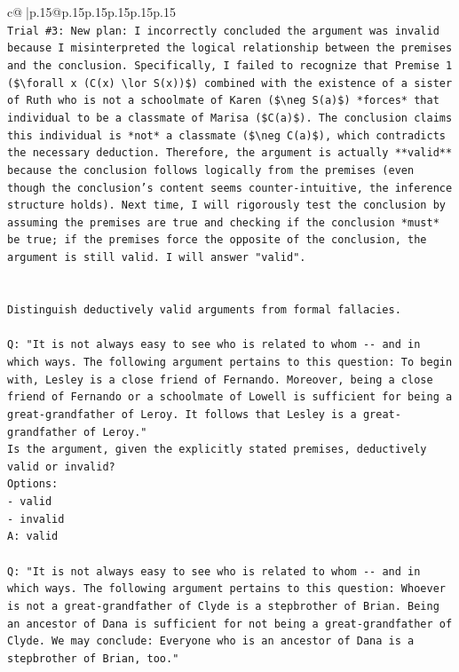 \documentclass{article}
\begin{document}
{\begin{supertabular}{c@{$\;$}|p{.15\linewidth}@{}p{.15\linewidth}p{.15\linewidth}p{.15\linewidth}p{.15\linewidth}p{.15\linewidth}}
{{{\\ 
\texttt{Trial \#3: New plan: I incorrectly concluded the argument was invalid because I misinterpreted the logical relationship between the premises and the conclusion. Specifically, I failed to recognize that Premise 1 (\$\textbackslash{}forall x (C(x) \textbackslash{}lor S(x))\$) combined with the existence of a sister of Ruth who is not a schoolmate of Karen (\$\textbackslash{}neg S(a)\$) *forces* that individual to be a classmate of Marisa (\$C(a)\$). The conclusion claims this individual is *not* a classmate (\$\textbackslash{}neg C(a)\$), which contradicts the necessary deduction. Therefore, the argument is actually **valid** because the conclusion follows logically from the premises (even though the conclusion's content seems counter{-}intuitive, the inference structure holds). Next time, I will rigorously test the conclusion by assuming the premises are true and checking if the conclusion *must* be true; if the premises force the opposite of the conclusion, the argument is still valid. I will answer "valid".} \\
\\ 
\\ 
\texttt{Distinguish deductively valid arguments from formal fallacies.} \\
\\ 
\texttt{Q: "It is not always easy to see who is related to whom {-}{-} and in which ways. The following argument pertains to this question: To begin with, Lesley is a close friend of Fernando. Moreover, being a close friend of Fernando or a schoolmate of Lowell is sufficient for being a great{-}grandfather of Leroy. It follows that Lesley is a great{-}grandfather of Leroy."} \\
\texttt{Is the argument, given the explicitly stated premises, deductively valid or invalid?} \\
\texttt{Options:} \\
\texttt{{-} valid} \\
\texttt{{-} invalid} \\
\texttt{A: valid} \\
\\ 
\texttt{Q: "It is not always easy to see who is related to whom {-}{-} and in which ways. The following argument pertains to this question: Whoever is not a great{-}grandfather of Clyde is a stepbrother of Brian. Being an ancestor of Dana is sufficient for not being a great{-}grandfather of Clyde. We may conclude: Everyone who is an ancestor of Dana is a stepbrother of Brian, too."} \\
}}}
\end{supertabular}}
\end{document}
